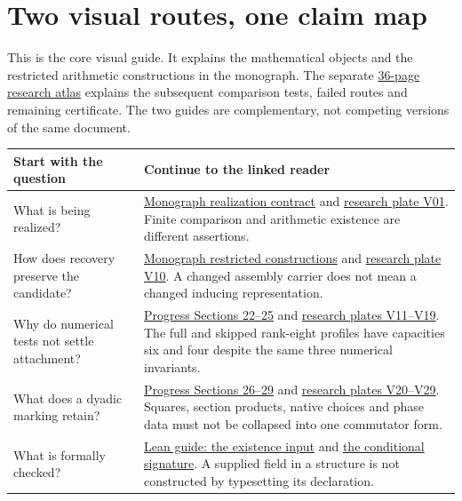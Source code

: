 \section*{Two visual routes, one claim map}
{}
This is the core visual guide. It explains the mathematical objects and the restricted arithmetic constructions in the monograph. The separate \href{https://komorebi.invalid/b07/visual_atlas}{36-page research atlas} explains the subsequent comparison tests, failed routes and remaining certificate. The two guides are complementary, not competing versions of the same document.

\begin{tabular}{@{}>{\raggedright\arraybackslash}p{.28\linewidth}>{\raggedright\arraybackslash}p{.67\linewidth}@{}}\toprule
Start with the question & Continue to the linked reader\\\midrule
What is being realized? & \href{https://komorebi.invalid/b07/visual_contract}{Monograph realization contract} and \href{https://komorebi.invalid/b07/visual_v01}{research plate V01}. Finite comparison and arithmetic existence are different assertions.\\[9pt]
How does recovery preserve the candidate? & \href{https://komorebi.invalid/b07/visual_recovery}{Monograph restricted constructions} and \href{https://komorebi.invalid/b07/visual_v10}{research plate V10}. A changed assembly carrier does not mean a changed inducing representation.\\[9pt]
Why do numerical tests not settle attachment? & \href{https://komorebi.invalid/b07/visual_conductors}{Progress Sections 22--25} and \href{https://komorebi.invalid/b07/visual_v15}{research plates V11--V19}. The full and skipped rank-eight profiles have capacities six and four despite the same three numerical invariants.\\[9pt]
What does a dyadic marking retain? & \href{https://komorebi.invalid/b07/visual_marks}{Progress Sections 26--29} and \href{https://komorebi.invalid/b07/visual_v20}{research plates V20--V29}. Squares, section products, native choices and phase data must not be collapsed into one commutator form.\\[9pt]
What is formally checked? & \href{https://komorebi.invalid/b07/visual_lean_input}{Lean guide: the existence input} and \href{https://komorebi.invalid/b07/visual_lean_signature}{the conditional signature}. A supplied field in a structure is not constructed by typesetting its declaration.\\\bottomrule
\end{tabular}

